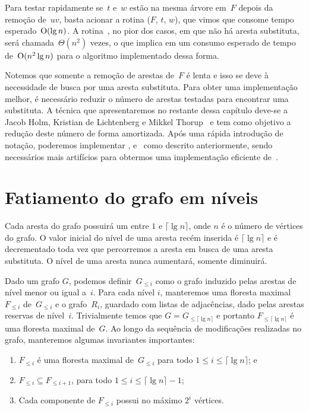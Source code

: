 Para testar rapidamente se~$t$ e~$w$ estão na mesma árvore em~$F$ depois da remoção de~$uv$, basta acionar a rotina \dymForestQuery($F$, $t$, $w$), que vimos que consome tempo esperado~$\mathrm{O}(\lg n)$. A rotina~\dymForestQuery{}, no pior dos casos, em que não há aresta substituta, será chamada~$\Theta(n^2)$ vezes, o que implica em um consumo esperado de tempo de~$\mathrm{O}(n^2\lg n)$ para o algoritmo implementado dessa forma.

Notemos que somente a remoção de arestas de~$F$ é lenta e isso se deve à necessidade de busca por uma aresta substituta. Para obter uma implementação melhor, é necessário reduzir o número de arestas testadas para encontrar uma substituta. A técnica que apresentaremos no restante dessa capítulo deve-se a Jacob Holm, Kristian de Lichtenberg e Mikkel Thorup~\cite{poly_log} e tem como objetivo a redução deste número de forma amortizada. Após uma rápida introdução de notação, poderemos implementar \dymGraphCreate{}, \dymGraphAddEdge{} e~\dymGraphQuery{} como descrito anteriormente, sendo necessários mais artifícios para obtermos uma implementação eficiente de~\dymGraphDelEdge{}.


\section{Fatiamento do grafo em níveis}
\label{sec:fatia-em-niveis}
Cada aresta do grafo possuirá um  entre $1$ e $\lceil \lg n \rceil$, onde $n$ é o número de vértices do grafo. O valor inicial do nível de uma aresta recém inserida é $\lceil \lg n \rceil$ e é decrementado toda vez que percorremos a aresta em busca de uma aresta substituta. O nível de uma aresta nunca aumentará, somente diminuirá. 

Dado um grafo $G$, podemos definir~$G_{\leqslant i}$ como o grafo induzido pelas arestas de nível menor ou igual a~$i$. Para cada nível $i$, manteremos uma floresta maximal~$F_{\leqslant i}$ de~$G_{\leqslant i}$ e o grafo~$R_i$, guardado com listas de adjacências, dado pelas arestas reservas de nível~$i$. Trivialmente temos que $G = G_{\leqslant \lceil \lg n \rceil}$ e portanto $F_{\leqslant \lceil \lg n \rceil}$ é uma floresta maximal de~$G$. Ao longo da sequência de modificações realizadas no grafo, manteremos algumas invariantes importantes:
\begin{enumerate}[label=(\roman*)]
    \item $F_{\leqslant i}$ é uma floresta maximal de~$G_{\leqslant i}$ para todo $1\leqslant i \leqslant \lceil \lg n \rceil$; e\label{invar:SF}
    \item $F_{\leqslant i}\subseteq F_{\leqslant i+1}$, para todo $1\leqslant i \leqslant \lceil \lg n \rceil-1$; \label{invar:contida}
    \item Cada componente de $F_{\leqslant i}$ possui no máximo $2^i$ vértices.\label{invar:tamanho}
\end{enumerate}

